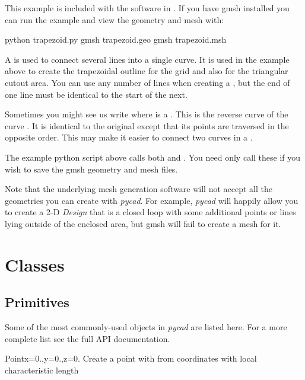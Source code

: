 This example is included with the software in
.  If you have gmsh installed you can
run the example and view the geometry and mesh with:

\begin{python}
	python trapezoid.py
	gmsh trapezoid.geo
	gmsh trapezoid.msh
\end{python}

A  is used to connect several lines into a single curve.
It is used in the example above to create the trapezoidal outline for the grid
and also for the triangular cutout area.
You can use any number of lines when creating a , but
the end of one line must be identical to the start of the next.

Sometimes you might see us write  where  is a
.  This is the reverse curve of the curve . 
It is identical to the original except that its points are traversed
in the opposite order.  This may make it easier to connect two curves
in a .

The example python script above calls both
 and .  You need
only call these if you wish to save the gmsh geometry and mesh files.

Note that the underlying mesh generation software will not accept all
the geometries you can create with {\it pycad}.  For example, {\it
pycad} will happily allow you to create a 2-D {\it Design} that is a
closed loop with some additional points or lines lying outside of the
enclosed area, but gmsh will fail to create a mesh for it.






\section{\pycad Classes}

\subsection{Primitives}

Some of the most commonly-used objects in {\it pycad} are listed here. For a more complete
list see the full API documentation.

\begin{classdesc}{Point}{x=0.,y=0.,z=0.}
Create a point with from coordinates with local characteristic length 
\end{classdesc}

